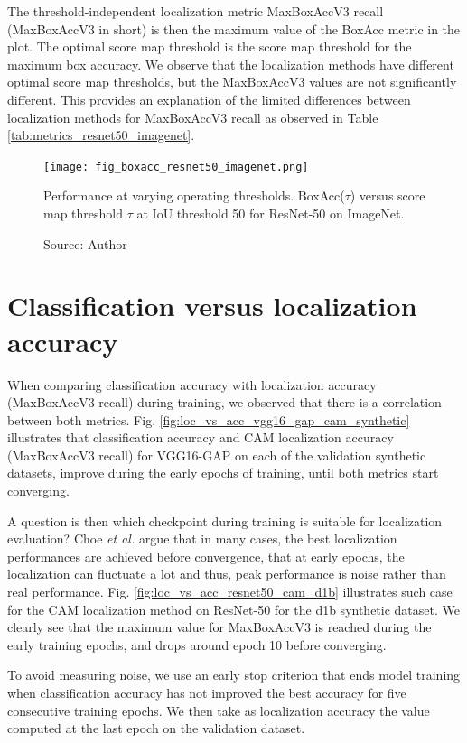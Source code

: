 The threshold-independent localization metric MaxBoxAccV3 recall (MaxBoxAccV3 in short) is then the maximum value of the BoxAcc metric in the plot. The optimal score map threshold is the score map threshold for the maximum box accuracy. We observe that the localization methods have different optimal score map thresholds, but the MaxBoxAccV3 values are not significantly different. This provides an explanation of the limited differences between localization methods for MaxBoxAccV3 recall as observed in Table \ref{tab:metrics_resnet50_imagenet}.

\begin{figure}[ht]
    \begin{center}       
    \texttt{[image: fig\_boxacc\_resnet50\_imagenet.png]}
    \caption[BoxAcc (IoU 50)for ResNet-50 on ImageNet]{Performance at varying operating thresholds. BoxAcc($\tau$) versus score map threshold $\tau$ at IoU threshold 50 for ResNet-50 on ImageNet.}
    \caption*{Source: Author}
    \label{fig:boxacc_resnet50_imagenet}
    \end{center}
\end{figure}

\section{Classification versus localization accuracy}
When comparing classification accuracy with localization accuracy (MaxBoxAccV3 recall) during training, we observed that there is a correlation between both metrics. Fig. \ref{fig:loc_vs_acc_vgg16_gap_cam_synthetic} illustrates that classification accuracy and CAM localization accuracy (MaxBoxAccV3 recall) for VGG16-GAP on each of the validation synthetic datasets, improve during the early epochs of training, until both metrics start converging.

A question is then which checkpoint during training is suitable for localization evaluation? Choe \textit{et al.} \cite{choe2020evaluating} argue that in many cases, the best localization performances are achieved before convergence, that at early epochs, the localization can fluctuate a lot and thus, peak performance is noise rather than real performance. Fig. \ref{fig:loc_vs_acc_resnet50_cam_d1b} illustrates such case for the CAM localization method on ResNet-50 for the d1b synthetic dataset. We clearly see that the maximum value for MaxBoxAccV3 is reached during the early training epochs, and drops around epoch 10 before converging.

To avoid measuring noise, we use an early stop criterion that ends model training when classification accuracy has not improved the best accuracy for five consecutive training epochs. We then take as localization accuracy the value computed at the last epoch on the validation dataset.

